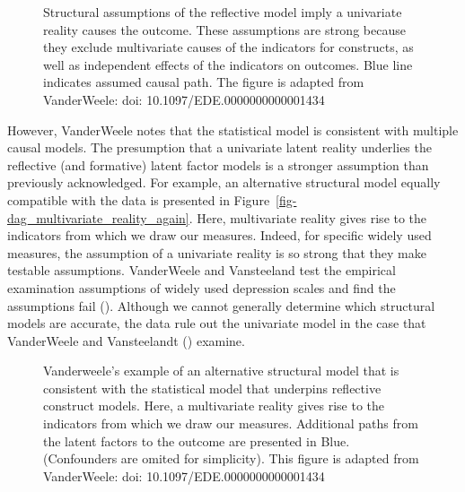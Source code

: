\documentclass[
  singlecolumn]{article}
\begin{document}
\begin{figure}


\caption{\label{fig-structural-assumptions-reflective-model}Structural
assumptions of the reflective model imply a univariate reality causes
the outcome. These assumptions are strong because they exclude
multivariate causes of the indicators for constructs, as well as
independent effects of the indicators on outcomes. Blue line indicates
assumed causal path. The figure is adapted from VanderWeele: doi:
10.1097/EDE.0000000000001434}

\end{figure}%

However, VanderWeele notes that the statistical model is consistent with
multiple causal models. The presumption that a univariate latent reality
underlies the reflective (and formative) latent factor models is a
stronger assumption than previously acknowledged. For example, an
alternative structural model equally compatible with the data is
presented in Figure~\ref{fig-dag_multivariate_reality_again}. Here,
multivariate reality gives rise to the indicators from which we draw our
measures. Indeed, for specific widely used measures, the assumption of a
univariate reality is so strong that they make testable assumptions.
VanderWeele and Vansteeland test the empirical examination assumptions
of widely used depression scales and find the assumptions fail
().
Although we cannot generally determine which structural models are
accurate, the data rule out the univariate model in the case that
VanderWeele and Vansteelandt ()
examine.

\begin{figure}


\caption{\label{fig-dag\_multivariate\_reality\_again}Vanderweele's
example of an alternative structural model that is consistent with the
statistical model that underpins reflective construct models. Here, a
multivariate reality gives rise to the indicators from which we draw our
measures. Additional paths from the latent factors to the outcome are
presented in Blue. (Confounders are omited for simplicity). This figure
is adapted from VanderWeele: doi: 10.1097/EDE.0000000000001434}

\end{figure}%
\end{document}
